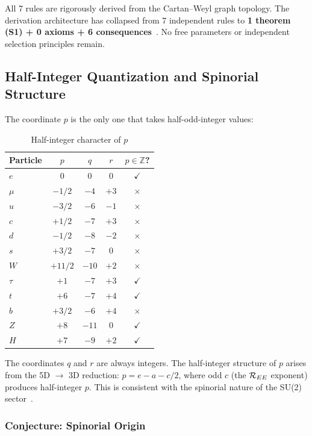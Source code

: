 All 7 rules are rigorously derived from the Cartan--Weyl graph topology. The derivation architecture has collapsed from 7 independent rules to \textbf{1 theorem (S1) + 0 axioms + 6 consequences}~\cite{paper1_killing_algebra,paper2_graph_topology}. No free parameters or independent selection principles remain.

\subsection{Half-Integer Quantization and Spinorial Structure}\label{sec:half_integer}

The coordinate $p$ is the only one that takes half-odd-integer values:

\begin{table}[h]
\centering
\caption{Half-integer character of $p$}
\begin{tabular}{lcccc}
\hline\hline
Particle & $p$ & $q$ & $r$ & $p \in \mathbb{Z}$? \\
\hline
$e$ & $0$ & $0$ & $0$ & $\checkmark$ \\
$\mu$ & $-1/2$ & $-4$ & $+3$ & $\times$ \\
$u$ & $-3/2$ & $-6$ & $-1$ & $\times$ \\
$c$ & $+1/2$ & $-7$ & $+3$ & $\times$ \\
$d$ & $-1/2$ & $-8$ & $-2$ & $\times$ \\
$s$ & $+3/2$ & $-7$ & $0$ & $\times$ \\
$W$ & $+11/2$ & $-10$ & $+2$ & $\times$ \\
$\tau$ & $+1$ & $-7$ & $+3$ & $\checkmark$ \\
$t$ & $+6$ & $-7$ & $+4$ & $\checkmark$ \\
$b$ & $+3/2$ & $-6$ & $+4$ & $\times$ \\
$Z$ & $+8$ & $-11$ & $0$ & $\checkmark$ \\
$H$ & $+7$ & $-9$ & $+2$ & $\checkmark$ \\
\hline\hline
\end{tabular}
\end{table}

The coordinates $q$ and $r$ are always integers. The half-integer structure of $p$ arises from the 5D $\to$ 3D reduction: $p = e - a - c/2$, where odd $c$ (the $\mathcal{R}_{EE}$ exponent) produces half-integer $p$. This is consistent with the spinorial nature of the SU(2) sector~\cite{connes1994noncommutative}.

\subsubsection{Conjecture: Spinorial Origin}

